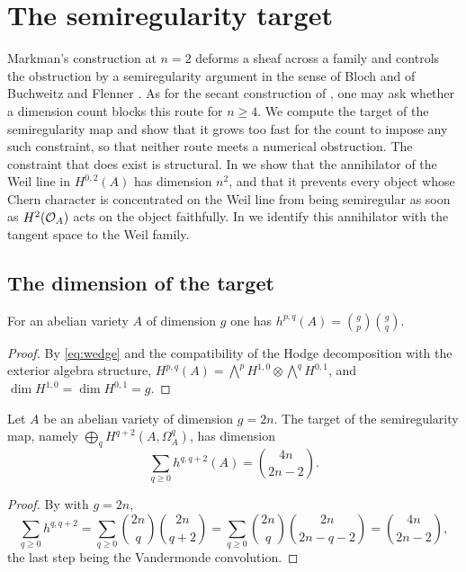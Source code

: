 \section{The semiregularity target}\label{sec:semireg}

Markman's construction at $n=2$ deforms a sheaf across a family and controls
the obstruction by a semiregularity argument in the sense of Bloch and of
Buchweitz and Flenner \cite{Blo72,BF03}. As for the secant construction of
, one may ask whether a dimension count blocks this route
for $n\ge4$. We compute the target of the semiregularity map and show that it
grows too fast for the count to impose any such constraint, so that neither
route meets a numerical obstruction. The constraint that does exist is
structural. In  we show that the annihilator of the Weil
line in $H^{0,2}(A)$ has dimension $n^{2}$, and that it prevents every object
whose Chern character is concentrated on the Weil line from being
semiregular as soon as $H^{2}(\mathcal{O}_{A})$ acts on the object faithfully. In
 we identify this annihilator with the tangent space to the
Weil family.

\subsection{The dimension of the target}

\begin{lemma}\label{lem:hodgenumbers}
For an abelian variety $A$ of dimension $g$ one has
$h^{p,q}(A)=\binom{g}{p}\binom{g}{q}$.
\end{lemma}

\begin{proof}
By \eqref{eq:wedge} and the compatibility of the Hodge decomposition with the
exterior algebra structure,
$H^{p,q}(A)=\bigwedge^{p}H^{1,0}\otimes\bigwedge^{q}H^{0,1}$, and
$\dim H^{1,0}=\dim H^{0,1}=g$.
\end{proof}

\begin{proposition}\label{prop:target}
Let $A$ be an abelian variety of dimension $g=2n$. The target of the
semiregularity map, namely $\bigoplus_{q}H^{q+2}(A,\Omega^{q}_{A})$, has
dimension
\[
  \sum_{q\ge0}h^{q,q+2}(A)=\binom{4n}{2n-2}.
\]
\end{proposition}

\begin{proof}
By  with $g=2n$,
\[
  \sum_{q\ge0}h^{q,q+2}
  =\sum_{q\ge0}\binom{2n}{q}\binom{2n}{q+2}
  =\sum_{q\ge0}\binom{2n}{q}\binom{2n}{2n-q-2}
  =\binom{4n}{2n-2},
\]
the last step being the Vandermonde convolution.
\end{proof}

